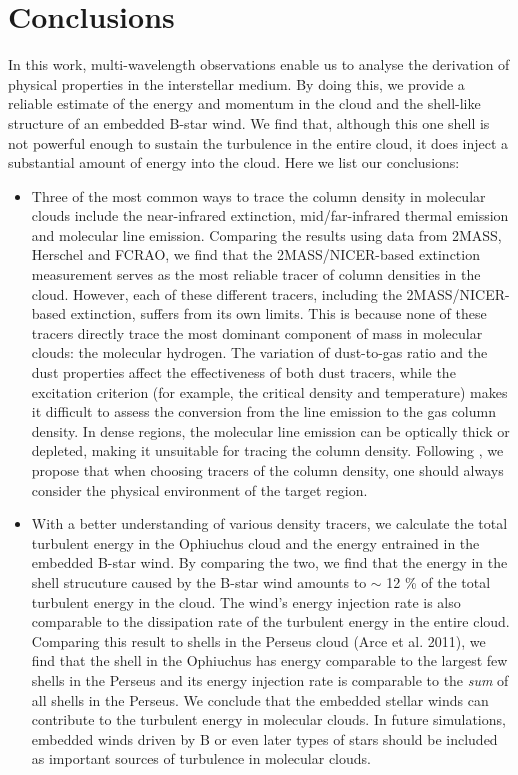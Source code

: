 \documentclass[11pt,a4paper]{emulateapj}
\begin{document}
\section{Conclusions}
In this work, multi-wavelength observations enable us to analyse the derivation of physical properties in the interstellar medium. By doing this, we provide a reliable estimate of the energy and momentum in the cloud and the shell-like structure of an embedded B-star wind. We find that, although this one shell is not powerful enough to sustain the turbulence in the entire cloud, it does inject a substantial amount of energy into the cloud. Here we list our conclusions:

\begin{itemize}
\item Three of the most common ways to trace the column density in molecular clouds include the near-infrared extinction, mid/far-infrared thermal emission and molecular line emission. Comparing the results using data from 2MASS, Herschel and FCRAO, we find that the 2MASS/NICER-based extinction measurement serves as the most reliable tracer of column densities in the cloud. However, each of these different tracers, including the 2MASS/NICER-based extinction, suffers from its own limits. This is because none of these tracers directly trace the most dominant component of mass in molecular clouds: the molecular hydrogen. The variation of dust-to-gas ratio and the dust properties affect the effectiveness of both dust tracers, while the excitation criterion (for example, the critical density and temperature) makes it difficult to assess the conversion from the line emission to the gas column density. In dense regions, the molecular line emission can be optically thick or depleted, making it unsuitable for tracing the column density. Following \citet{Goodman_2009}, we propose that when choosing tracers of the column density, one should always consider the physical environment of the target region. 
\item With a better understanding of various density tracers, we calculate the total turbulent energy in the Ophiuchus cloud and the energy entrained in the embedded B-star wind. By comparing the two, we find that the energy in the shell strucuture caused by the B-star wind amounts to $\sim$ 12 \% of the total turbulent energy in the cloud. The wind's energy injection rate is also comparable to the dissipation rate of the turbulent energy in the entire cloud. Comparing this result to shells in the Perseus cloud (Arce et al. 2011), we find that the shell in the Ophiuchus has energy comparable to the largest few shells in the Perseus and its energy injection rate is comparable to the \emph{sum} of all shells in the Perseus. We conclude that the embedded stellar winds can contribute to the turbulent energy in molecular clouds. In future simulations, embedded winds driven by B or even later types of stars should be included as important sources of turbulence in molecular clouds.
\end{itemize}



\end{document}

